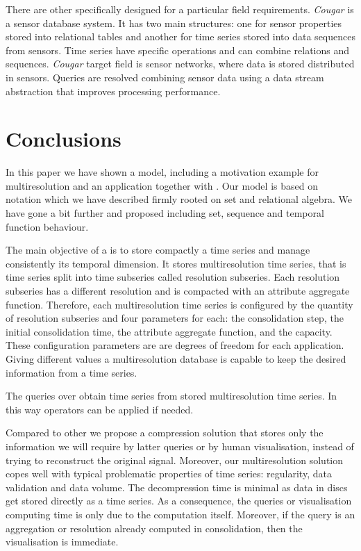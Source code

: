 There are other  specifically designed for a particular
field requirements.  \emph{Cougar}
\cite{bonnet01} is a sensor database system. It has two main
structures: one for sensor properties stored into relational tables
and another for time series stored into data sequences from
sensors. Time series have specific operations and can combine
relations and sequences. \emph{Cougar} target field is sensor networks, where
data is stored distributed in sensors. Queries are resolved combining
sensor data using a data stream abstraction that improves processing
performance.






\section{Conclusions}
\label{sec:concl-future-work}


In this paper we have shown a  model, including a
motivation example for multiresolution and an application together
with . Our  model is based on 
notation which we have described firmly rooted on set and relational
algebra. We have gone a bit further and proposed  including
set, sequence and temporal function behaviour.



The main objective of a  is to store compactly a time
series and manage consistently its temporal dimension.  It stores
multiresolution time series, that is time series split into time
subseries called resolution subseries.  Each resolution subseries has
a different resolution and is compacted with an attribute aggregate
function. Therefore, each multiresolution time series is configured by
the quantity of resolution subseries and four parameters for each: the
consolidation step, the initial consolidation time, the attribute
aggregate function, and the capacity.  These configuration parameters
are are degrees of freedom for each application. Giving different
values a multiresolution database is capable to keep the desired
information from a time series.



The queries over  obtain time series from stored
multiresolution time series. In this way  operators can be
applied if needed.


Compared to other  we propose a compression solution that
stores only the information we will require by latter queries or by
human visualisation, instead of trying to reconstruct the original
signal.  Moreover, our multiresolution solution copes well with
typical problematic properties of time series: regularity, data
validation and data volume.  The decompression time is minimal as data
in discs get stored directly as a time series. As a consequence, the
queries or visualisation computing time is only due to the computation
itself. Moreover, if the query is an aggregation or resolution already
computed in  consolidation, then the visualisation is
immediate.


